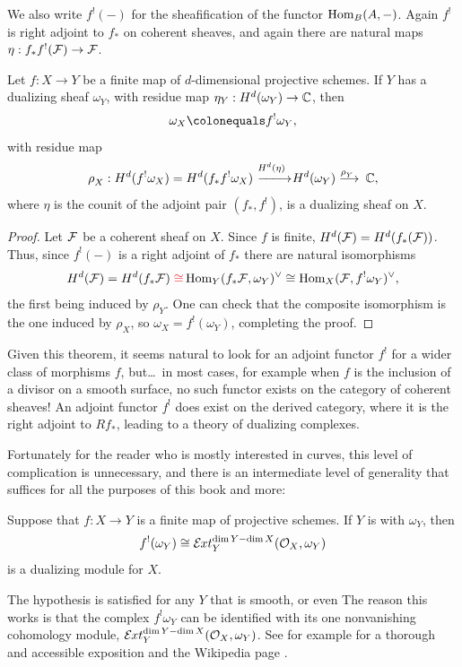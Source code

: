 We also write $f^{!}(-)$ for the sheafification of the functor
$\operatorname{Hom}_{B}(A,-)$. Again $f^{!}$ is right adjoint to $f_{*}$ on coherent
sheaves,
and again there are natural maps $\eta:f_{*}f^{!}({\mathcal F}) \to{\mathcal F}$.

\begin{theorem}\label{canonical as Hom}
\!Let $f{:}X{\to}Y$ be a finite map of $d$-dimensional projective schemes.
If $Y$ has a dualizing sheaf $\omega_{Y}$,
with residue map $\eta_{Y}: H^{d}(\omega_{Y}) \to {\mathbb C}$,
then
$$
\omega_{X} \colonequals f^{!}\omega_{Y},
$$
with residue map
$$
\rho^{}_{X}: H^{d}(f^{!}\omega_{X}) = H^{d}(f_{*}f^{!}\omega_{X}) \,\ruuto
{\!\!H^{d}(\eta)} H^{d}(\omega_{Y}) \ruto {\!\rho^{}_{Y}} \CC,
$$
where $\eta$ is the counit of the adjoint pair $(f_{*},f^{!})$, is a
dualizing sheaf on $X$.
\unif
\end{theorem}

\begin{proof}
Let ${\mathcal F}$ be a coherent sheaf on $X$. Since $f$ is finite,
$H^{d}({\mathcal F}) = H^{d}(f_{*}({\mathcal F}))$. Thus,
since $f^{!}(-)$ is a right adjoint of $f_{*}$ there are natural
isomorphisms
$$
H^{d}(\sF) = H^{d}(f_{*}\sF)
\redden{{}\cong}
\Hom_{Y}(f_{*}\sF, \omega_{Y})^{\vee} \cong
\Hom_{X}(\sF, f^{!}\omega_{Y})^{\vee},
$$
the first being
induced by $\rho^{}_{Y}$. One
can check that the composite
isomorphism is the one induced by $\rho^{}_{X}$, so $\omega_X =
f^{!}(\omega_{Y})$, completing the proof.
\end{proof}

\begin{fact}
Given this theorem, it seems natural to look for an adjoint functor
$f^{!}$ for a wider class of morphisms
$f$, but\dots\ in most cases, for example when $f$ is the inclusion of a
divisor on a smooth surface, no such functor exists on the category of
coherent sheaves!
An adjoint functor
$f^{!}$ does exist on the derived category, where it is the right adjoint
to $Rf_{*}$, leading to a theory
of dualizing complexes.

Fortunately for the reader who is mostly interested in curves, this
level of
complication is unnecessary, and there is an intermediate level of
generality that suffices
for all the purposes of this book and more:

\begin{theorem}\label{general adjunction}
Suppose that $f: X\to Y$ is a finite map of projective schemes. If $Y$ is
%
with
%
$\omega_{Y}$, then
$$
f^{!}(\omega_{Y}) \cong \mathcal E\mkern-1mu xt^{\dim Y-\dim X}_{Y}({\mathcal O}_{X}, \omega_{Y})
$$
is a dualizing module for $X$.
\end{theorem}

The hypothesis is satisfied for any $Y$ that is smooth, or even 
%
The
reason this works is that the complex
$f^{!} \omega_{Y}$
can be identified with its one nonvanishing cohomology module,
$\mathcal E\mkern-1mu xt^{\dim Y-\dim X}_{Y}({\mathcal O}_{X}, \omega_{Y})$.
See for example \cite{AltmanKleiman} for a thorough and accessible
exposition and the Wikipedia page \cite{SixOperations}. \end{fact}

